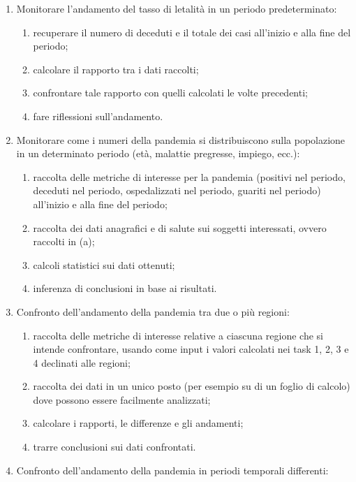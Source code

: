 \begin{enumerate}[resume]
    \item Monitorare l'andamento del tasso di letalità in un periodo predeterminato:
    \begin{enumerate}[label=\alph*]
        \item recuperare il numero di deceduti e il totale dei casi all'inizio e alla fine del periodo;
        \item calcolare il rapporto tra i dati raccolti;
        \item confrontare tale rapporto con quelli calcolati le volte precedenti;
        \item fare riflessioni sull'andamento.
    \end{enumerate}
    \item Monitorare come i numeri della pandemia si distribuiscono sulla popolazione in un determinato periodo (età, malattie pregresse, impiego, ecc.):
    \begin{enumerate}[label=\alph*]
        \item raccolta delle metriche di interesse per la pandemia (positivi nel periodo, deceduti nel periodo, ospedalizzati nel periodo, guariti nel periodo) all'inizio e alla fine del periodo;
        \item raccolta dei dati anagrafici e di salute sui soggetti interessati, ovvero raccolti in (a);
        \item calcoli statistici sui dati ottenuti;
        \item inferenza di conclusioni in base ai risultati.
    \end{enumerate}
    \item Confronto dell'andamento della pandemia tra due o più regioni:
    \begin{enumerate}[label=\alph*]
        \item raccolta delle metriche di interesse relative a ciascuna regione che si intende confrontare, usando come input i valori calcolati nei task 1, 2, 3 e 4 declinati alle regioni;
        \item raccolta dei dati in un unico posto (per esempio su di un foglio di calcolo) dove possono essere facilmente analizzati;
        \item calcolare i rapporti, le differenze e gli andamenti;
        \item trarre conclusioni sui dati confrontati.
    \end{enumerate}
    \item Confronto dell'andamento della pandemia in periodi temporali differenti:

\end{enumerate}
